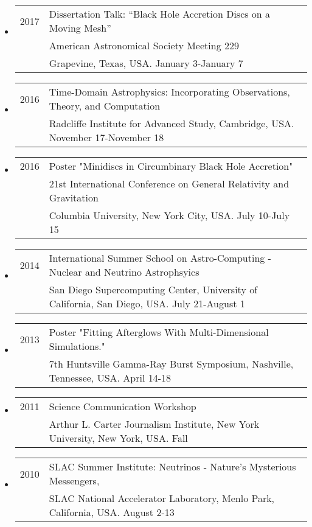 \begin{itemize}
\item \begin{tabular}{ll}
2017 & Dissertation Talk: ``Black Hole Accretion Discs on a Moving Mesh'' \\
	 & American Astronomical Society Meeting 229 \\
	 & Grapevine, Texas, USA. January 3-January 7
\end{tabular}
\item \begin{tabular}{ll}
2016 & Time-Domain Astrophysics: Incorporating Observations, Theory, and Computation \\
	 & Radcliffe Institute for Advanced Study, Cambridge, USA. November 17-November 18
\end{tabular}
\item \begin{tabular}{ll}
2016 & Poster "Minidiscs in Circumbinary Black Hole Accretion" \\
	& 21st International Conference on General Relativity and Gravitation \\ 
	& Columbia University, New York City, USA. July 10-July 15
\end{tabular}

\item \begin{tabular}{ll}
2014 & International Summer School on Astro-Computing - Nuclear and Neutrino Astrophsyics \\ 
	& San Diego Supercomputing Center, University of California, San Diego, USA. July 21-August 1
\end{tabular}

\item \begin{tabular}{ll}
2013 & Poster "Fitting Afterglows With Multi-Dimensional Simulations." \\ 
	&7th Huntsville Gamma-Ray Burst Symposium, Nashville, Tennessee, USA.  April 14-18 \\
\end{tabular}

\item \begin{tabular}{ll}
2011 & Science Communication Workshop\\
	& Arthur L. Carter Journalism Institute, New York University, New York, USA.  Fall \\
\end{tabular}

\item \begin{tabular}{ll}
2010 & SLAC Summer Institute: Neutrinos - Nature's Mysterious Messengers, \\ 
	 & SLAC National Accelerator Laboratory, Menlo Park, California, USA.  August 2-13\\
\end{tabular}
\end{itemize}

